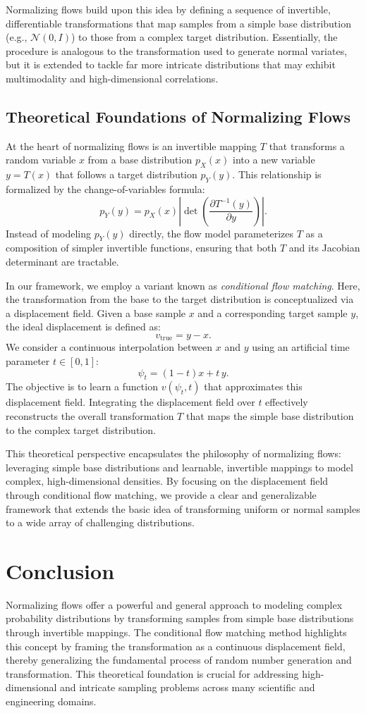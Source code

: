 Normalizing flows build upon this idea by defining a sequence of invertible, differentiable transformations that map samples from a simple base distribution (e.g., \(\mathcal{N}(0,I)\)) to those from a complex target distribution. Essentially, the procedure is analogous to the transformation used to generate normal variates, but it is extended to tackle far more intricate distributions that may exhibit multimodality and high-dimensional correlations.

\subsection{Theoretical Foundations of Normalizing Flows}
At the heart of normalizing flows is an invertible mapping \(T\) that transforms a random variable \(x\) from a base distribution \(p_X(x)\) into a new variable \(y = T(x)\) that follows a target distribution \(p_Y(y)\). This relationship is formalized by the change-of-variables formula:
\[
p_Y(y) = p_X(x) \left| \det \left( \frac{\partial T^{-1}(y)}{\partial y} \right) \right|.
\]
Instead of modeling \(p_Y(y)\) directly, the flow model parameterizes \(T\) as a composition of simpler invertible functions, ensuring that both \(T\) and its Jacobian determinant are tractable.

In our framework, we employ a variant known as \emph{conditional flow matching}. Here, the transformation from the base to the target distribution is conceptualized via a displacement field. Given a base sample \(x\) and a corresponding target sample \(y\), the ideal displacement is defined as:
\[
v_{\text{true}} = y - x.
\]
We consider a continuous interpolation between \(x\) and \(y\) using an artificial time parameter \(t \in [0,1]\):
\[
\psi_t = (1-t)x + t\, y.
\]
The objective is to learn a function \(v(\psi_t, t)\) that approximates this displacement field. Integrating the displacement field over \(t\) effectively reconstructs the overall transformation \(T\) that maps the simple base distribution to the complex target distribution.

This theoretical perspective encapsulates the philosophy of normalizing flows: leveraging simple base distributions and learnable, invertible mappings to model complex, high-dimensional densities. By focusing on the displacement field through conditional flow matching, we provide a clear and generalizable framework that extends the basic idea of transforming uniform or normal samples to a wide array of challenging distributions.

\section{Conclusion}
Normalizing flows offer a powerful and general approach to modeling complex probability distributions by transforming samples from simple base distributions through invertible mappings. The conditional flow matching method highlights this concept by framing the transformation as a continuous displacement field, thereby generalizing the fundamental process of random number generation and transformation. This theoretical foundation is crucial for addressing high-dimensional and intricate sampling problems across many scientific and engineering domains.
